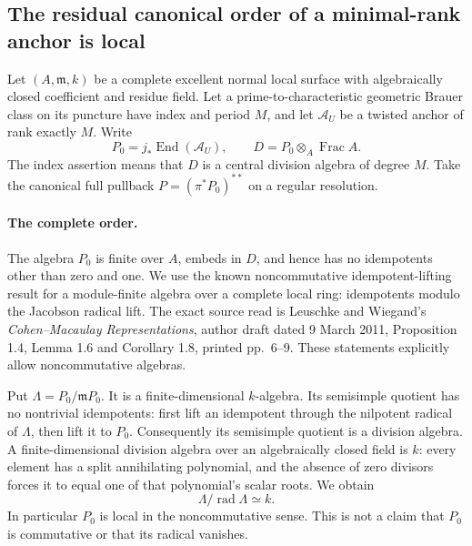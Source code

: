 \subsection*{The residual canonical order of a minimal-rank anchor is local}

Let $(A,\mathfrak m,k)$ be a complete excellent normal local surface
with algebraically closed coefficient and residue field.  Let a
prime-to-characteristic geometric Brauer class on its puncture have
index and period $M$, and let $\mathcal A_U$ be a twisted anchor of
rank exactly $M$.  Write
\[
             P_0=j_*\operatorname{End}(\mathcal A_U),
             \qquad D=P_0\otimes_A\operatorname{Frac}A.
\]
The index assertion means that $D$ is a central division algebra
of degree $M$.  Take the canonical full pullback
$P=(\pi^*P_0)^{**}$ on a regular resolution.

\paragraph{The complete order.}
The algebra $P_0$ is finite over $A$, embeds in $D$, and hence has
no idempotents other than zero and one.  We use the known
noncommutative idempotent-lifting result for a module-finite algebra
over a complete local ring: idempotents modulo the Jacobson radical
lift.  The exact source read is Leuschke and Wiegand's
\emph{Cohen--Macaulay Representations}, author draft dated 9 March
2011, Proposition 1.4, Lemma 1.6 and Corollary 1.8, printed pp.~6--9.
These statements explicitly allow noncommutative algebras.

Put $\Lambda=P_0/\mathfrak mP_0$.  It is a finite-dimensional
$k$-algebra.  Its semisimple quotient has no nontrivial idempotents:
first lift an idempotent through the nilpotent radical of $\Lambda$,
then lift it to $P_0$.  Consequently its semisimple quotient is a
division algebra.  A finite-dimensional division algebra over an
algebraically closed field is $k$: every element has a split
annihilating polynomial, and the absence of zero divisors forces it
to equal one of that polynomial's scalar roots.  We obtain
\[
             \Lambda/\operatorname{rad}\Lambda\simeq k.
\]
In particular $P_0$ is local in the noncommutative sense.  This is
not a claim that $P_0$ is commutative or that its radical vanishes.

